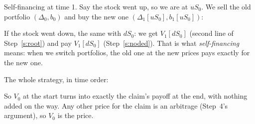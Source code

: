 \begin{steps}[resume]
\item\label{s:sf2} Self-financing at time 1. Say the stock went up, so we are at $uS_0$. We sell the old portfolio $(\Delta_0,b_0)$ and buy the new one $(\Delta_1[uS_0],b_1[uS_0])$:
\begin{deriv}
\end{deriv}
If the stock went down, the same with $dS_0$: we get $V_1[dS_0]$ (second line of Step~\ref{s:root}) and pay $V_1[dS_0]$ (Step~\ref{s:noded}). That is what \emph{self-financing} means: when we switch portfolios, the old one at the new prices pays exactly for the new one.

\item\label{s:story} The whole strategy, in time order:
\begin{deriv}
\end{deriv}
So $V_0$ at the start turns into exactly the claim's payoff at the end, with nothing added on the way. Any other price for the claim is an arbitrage (Step~4's argument), so $V_0$ is the price.


\end{steps}
